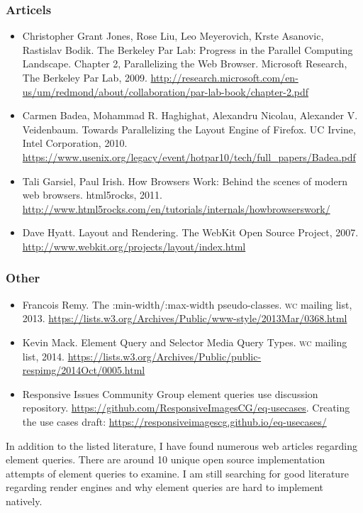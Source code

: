 \documentclass[oneside,a4paper,11pt]{kth-mag}
\begin{document}
\subsubsection*{Articels}
\begin{itemize}
\item Christopher Grant Jones, Rose Liu, Leo Meyerovich, Krste Asanovic, Rastislav Bodik. The Berkeley Par Lab: Progress in the Parallel Computing Landscape. Chapter 2, Parallelizing the Web Browser. Microsoft Research, The Berkeley Par Lab, 2009. \url{http://research.microsoft.com/en-us/um/redmond/about/collaboration/par-lab-book/chapter-2.pdf}
\item Carmen Badea, Mohammad R. Haghighat, Alexandru Nicolau, Alexander V. Veidenbaum. Towards Parallelizing the Layout Engine of Firefox. UC Irvine, Intel Corporation, 2010. \url{https://www.usenix.org/legacy/event/hotpar10/tech/full_papers/Badea.pdf}
\item Tali Garsiel, Paul Irish. How Browsers Work: Behind the scenes of modern web browsers. html5rocks, 2011. \url{http://www.html5rocks.com/en/tutorials/internals/howbrowserswork/}
\item Dave Hyatt. Layout and Rendering. The WebKit Open Source Project, 2007. \url{http://www.webkit.org/projects/layout/index.html}
\end{itemize}

\subsubsection{Other}
\begin{itemize}
\item Francois Remy. The :min-width/:max-width pseudo-classes. \textsc{w}\textsc{c} mailing list, 2013. \url{https://lists.w3.org/Archives/Public/www-style/2013Mar/0368.html}
\item Kevin Mack. Element Query and Selector Media Query Types. \textsc{w}\textsc{c} mailing list, 2014. \url{https://lists.w3.org/Archives/Public/public-respimg/2014Oct/0005.html}
\item Responsive Issues Community Group element queries use discussion repository. \url{https://github.com/ResponsiveImagesCG/eq-usecases}. Creating the use cases draft: \url{https://responsiveimagescg.github.io/eq-usecases/}
\end{itemize}

In addition to the listed literature, I have found numerous web articles regarding element queries. There are around 10 unique open source implementation attempts of element queries to examine. I am still searching for good literature regarding render engines and why element queries are hard to implement natively.
\end{document}
